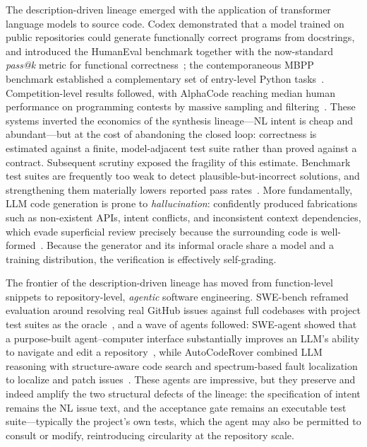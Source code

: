 The description-driven lineage emerged with the application of transformer language models to source code. Codex demonstrated that a model trained on public repositories could generate functionally correct programs from docstrings, and introduced the HumanEval benchmark together with the now-standard \emph{pass@k} metric for functional correctness~\cite{chen2021codex}; the contemporaneous MBPP benchmark established a complementary set of entry-level Python tasks~\cite{austin2021mbpp}. Competition-level results followed, with AlphaCode reaching median human performance on programming contests by massive sampling and filtering~\cite{li2022alphacode}. These systems inverted the economics of the synthesis lineage---NL intent is cheap and abundant---but at the cost of abandoning the closed loop: correctness is estimated against a finite, model-adjacent test suite rather than proved against a contract. Subsequent scrutiny exposed the fragility of this estimate. Benchmark test suites are frequently too weak to detect plausible-but-incorrect solutions, and strengthening them materially lowers reported pass rates~\cite{liu2023evalplus}. More fundamentally, LLM code generation is prone to \emph{hallucination}: confidently produced fabrications such as non-existent APIs, intent conflicts, and inconsistent context dependencies, which evade superficial review precisely because the surrounding code is well-formed~\cite{zhang2025hallucination}. Because the generator and its informal oracle share a model and a training distribution, the verification is effectively self-grading.

The frontier of the description-driven lineage has moved from function-level snippets to repository-level, \emph{agentic} software engineering. SWE-bench reframed evaluation around resolving real GitHub issues against full codebases with project test suites as the oracle~\cite{jimenez2024swebench}, and a wave of agents followed: SWE-agent showed that a purpose-built agent--computer interface substantially improves an LLM's ability to navigate and edit a repository~\cite{yang2024sweagent}, while AutoCodeRover combined LLM reasoning with structure-aware code search and spectrum-based fault localization to localize and patch issues~\cite{zhang2024autocoderover}. These agents are impressive, but they preserve and indeed amplify the two structural defects of the lineage: the specification of intent remains the NL issue text, and the acceptance gate remains an executable test suite---typically the project's own tests, which the agent may also be permitted to consult or modify, reintroducing circularity at the repository scale.

